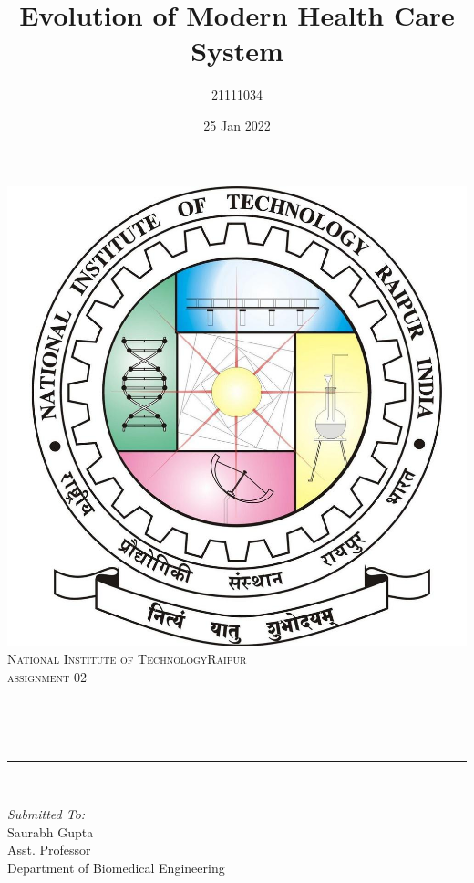 \documentclass[12pt]{article}
\title{Evolution of Modern Health Care System}								%
\author{21111034}								%
\date{25 Jan 2022}											%
\makeatletter
\let\thetitle\@title
\makeatother
\begin{document}

\begin{titlepage}
	\centering
    \vspace*{0.5 cm}
    \includegraphics[scale = 0.20]{logo.jpeg}\\[1.0 cm]	%
    \textsc{\LARGE  National Institute of Technology\newline\newline Raipur}\\[2.0 cm]	%
	\textsc{\Large assignment 02}\\[0.5 cm]				%
	\rule{\linewidth}{0.2 mm} \\[0.4 cm]
	{ \huge \bfseries \thetitle}\\
	\rule{\linewidth}{0.2 mm} \\[1.0 cm]
	
	\begin{minipage}{0.4\textwidth}
		\begin{flushleft} \large
			\emph{Submitted To:}\\
			Saurabh Gupta\\
            Asst. Professor\\
            Department of Biomedical Engineering\\
			\end{flushleft}
			\end{minipage}~
			\begin{minipage}{0.4\textwidth}
            

\end{minipage}
\end{titlepage}
\end{document}
